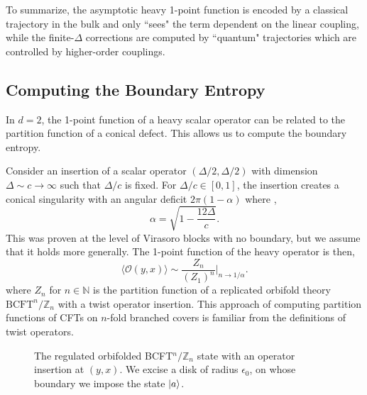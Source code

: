 \documentclass[reprint,amsmath,amssymb,aps,nofootinbib,twocolumn]{revtex4-2}
\newcommand{\sanjit}[1]{\textcolor{red}{\textbf{??SS:} #1}}
\begin{document}
To summarize, the asymptotic heavy 1-point function is encoded by a classical trajectory in the bulk and only ``sees" the term dependent on the linear coupling, while the finite-$\Delta$ corrections are computed by ``quantum" trajectories which are controlled by higher-order couplings.

\subsection{Computing the Boundary Entropy}

In $d = 2$, the 1-point function of a heavy scalar operator can be related to the partition function of a conical defect. This allows us to compute the boundary entropy.

Consider an insertion of a scalar operator $ (\Delta\slash 2, \Delta \slash 2) $ with dimension $ \Delta \sim c \rightarrow \infty $ such that $ \Delta\slash c $ is fixed. For $ \Delta\slash c \in [0,1] $, the insertion creates a conical singularity with an angular deficit $ 2\pi(1-\alpha) $ where \cite{asplund_holographic_2015,fitzpatrick_virasoro_2015},
\begin{equation}
\alpha = \sqrt{1-\frac{12\Delta}{c}}.
\end{equation}
This was proven at the level of Virasoro blocks with no boundary, but we assume that it holds more generally. The 1-point function of the heavy operator is then,
\begin{equation}
\langle \mathcal{O}(y,x)\rangle \sim \frac{Z_n}{(Z_1)^{n}}\bigg\lvert_{n\rightarrow 1\slash \alpha}.
\label{1pointasdefect}
\end{equation}
where $ Z_n $ for $ n\in \mathbb{N} $ is the partition function of a replicated orbifold theory $ \text{BCFT}^{n}\slash \mathbb{Z}_n $ with a twist operator insertion. This approach of computing partition functions of CFTs on $ n $-fold branched covers is familiar from the definitions of twist operators.

\begin{figure}
\centering
{}

\caption{The regulated orbifolded BCFT$^n/\mathbb{Z}_n$ state with an operator insertion at $(y,x)$. We excise a disk of radius $\epsilon_0$, on whose boundary we impose the state $\ket{a}$.}
\label{figs:replicaBCFT}
\end{figure}
\end{document}
